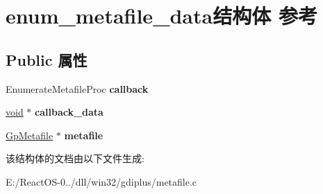 \hypertarget{structenum__metafile__data}{}\section{enum\+\_\+metafile\+\_\+data结构体 参考}
\label{structenum__metafile__data}
\subsection*{Public 属性}
\begin{DoxyCompactItemize}
\item 
\mbox{\label{structenum__metafile__data_a33b75418814610df48819d57aedee283}} 
Enumerate\+Metafile\+Proc {\bfseries callback}
\item 
\mbox{\label{structenum__metafile__data_ab15acdc3adb4e5e1dcc9cebb4a6c444d}} 
\hyperlink{interfacevoid}{void} $\ast$ {\bfseries callback\+\_\+data}
\item 
\mbox{\label{structenum__metafile__data_af0860e79c6bd58c82ee8a65735770bbd}} 
\hyperlink{struct_gp_metafile}{Gp\+Metafile} $\ast$ {\bfseries metafile}
\end{DoxyCompactItemize}


该结构体的文档由以下文件生成\+:\begin{DoxyCompactItemize}
\item 
E\+:/\+React\+O\+S-\/0../dll/win32/gdiplus/metafile.\+c\end{DoxyCompactItemize}
